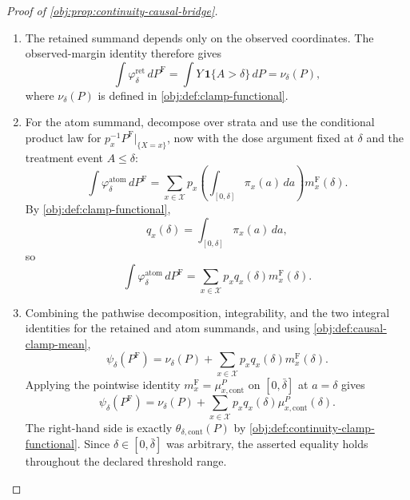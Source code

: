 \begin{proof}[Proof of \cref{obj:prop:continuity-causal-bridge}]
\begin{enumerate}
\item The retained summand depends only on the observed coordinates.  The observed-margin identity therefore gives
\[
\int \varphi_{\delta}^{\mathrm{ret}}\,dP^{\mathrm F}
=
\int Y\,\mathbf 1\{A>\delta\}\,dP
=
\nu_\delta(P),
\]
where \(\nu_\delta(P)\) is defined in \cref{obj:def:clamp-functional}.

\item For the atom summand, decompose over strata and use the conditional product law for \(p_x^{-1}P^{\mathrm F}|_{\{X=x\}}\), now with the dose argument fixed at \(\delta\) and the treatment event \(A\le\delta\):
\[
\int \varphi_{\delta}^{\mathrm{atom}}\,dP^{\mathrm F}
=
\sum_{x\in\mathcal X}
p_x
\left(\int_{[0,\delta]}\pi_x(a)\,da\right)
m_x^{\mathrm F}(\delta).
\]
By \cref{obj:def:clamp-functional},
\[
q_x(\delta)=\int_{[0,\delta]}\pi_x(a)\,da,
\]
so
\[
\int \varphi_{\delta}^{\mathrm{atom}}\,dP^{\mathrm F}
=
\sum_{x\in\mathcal X}p_x q_x(\delta)m_x^{\mathrm F}(\delta).
\]

\item Combining the pathwise decomposition, integrability, and the two integral identities for the retained and atom summands, and using \cref{obj:def:causal-clamp-mean},
\[
\psi_\delta(P^{\mathrm F})
=
\nu_\delta(P)
+
\sum_{x\in\mathcal X}p_x q_x(\delta)m_x^{\mathrm F}(\delta).
\]
Applying the pointwise identity \(m_x^{\mathrm F}=\mu_{x,\mathrm{cont}}^P\) on \([0,\bar\delta]\) at \(a=\delta\) gives
\[
\psi_\delta(P^{\mathrm F})
=
\nu_\delta(P)
+
\sum_{x\in\mathcal X}p_x q_x(\delta)\mu_{x,\mathrm{cont}}^P(\delta).
\]
The right-hand side is exactly \(\theta_{\delta,\mathrm{cont}}(P)\) by \cref{obj:def:continuity-clamp-functional}.  Since \(\delta\in[0,\bar\delta]\) was arbitrary, the asserted equality holds throughout the declared threshold range.
\end{enumerate}
\end{proof}

